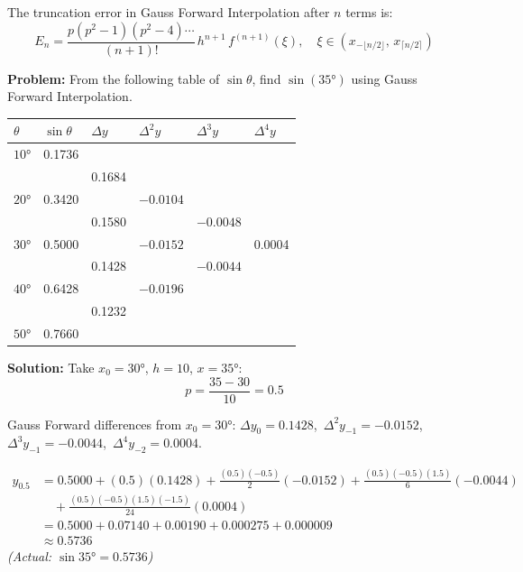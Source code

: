 \documentclass[12pt]{article}
\newcommand{\hcell}[1]{\textbf{\color{white}#1}}
\begin{document}
\bigskip

\begin{thmbox}
The truncation error in Gauss Forward Interpolation after $n$ terms is:
\[
  E_n = \frac{p(p^2-1)(p^2-4)\cdots}{(n+1)!}\,h^{n+1}\,f^{(n+1)}(\xi), \quad \xi \in (x_{-\lfloor n/2\rfloor},\, x_{\lceil n/2\rceil})
\]
\end{thmbox}

\bigskip

\begin{examplebox*}
\textbf{Problem:} From the following table of $\sin\theta$, find $\sin(35°)$ using Gauss Forward Interpolation.

\begin{center}{\small
\begin{tabular}{C{2cm} C{2.2cm} C{2.2cm} C{2.5cm} C{2.5cm} C{2.5cm}}
\toprule
{}
\hcell{$\theta$} & \hcell{$\sin\theta$} & \hcell{$\Delta y$} & \hcell{$\Delta^2 y$} & \hcell{$\Delta^3 y$} & \hcell{$\Delta^4 y$} \\
\midrule
{}
$10°$ & 0.1736 &        &           &           &        \\
      &        & 0.1684 &           &           &        \\
$20°$ & 0.3420 &        & $-0.0104$ &           &        \\
      &        & 0.1580 &           & $-0.0048$ &        \\
$30°$ & 0.5000 &        & $-0.0152$ &           & 0.0004 \\
      &        & 0.1428 &           & $-0.0044$ &        \\
$40°$ & 0.6428 &        & $-0.0196$ &           &        \\
      &        & 0.1232 &           &           &        \\
$50°$ & 0.7660 &        &           &           &        \\
\bottomrule
\end{tabular}
}\end{center}

\textbf{Solution:} Take $x_0 = 30°$, $h = 10$, $x = 35°$:
\[
  p = \frac{35 - 30}{10} = 0.5
\]

Gauss Forward differences from $x_0 = 30°$: $\Delta y_0 = 0.1428$,\ $\Delta^2 y_{-1} = -0.0152$,\ $\Delta^3 y_{-1} = -0.0044$,\ $\Delta^4 y_{-2} = 0.0004$.

\begin{align*}
y_{0.5} &= 0.5000 + (0.5)(0.1428) + \frac{(0.5)(-0.5)}{2}(-0.0152) + \frac{(0.5)(-0.5)(1.5)}{6}(-0.0044) \\[4pt]
        &\quad + \frac{(0.5)(-0.5)(1.5)(-1.5)}{24}(0.0004) \\[4pt]
        &= 0.5000 + 0.07140 + 0.00190 + 0.000275 + 0.000009 \\[4pt]
        &\approx \boxed{0.5736}
\end{align*}
\textit{(Actual: $\sin 35° = 0.5736$)}
\end{examplebox*}
\end{document}
